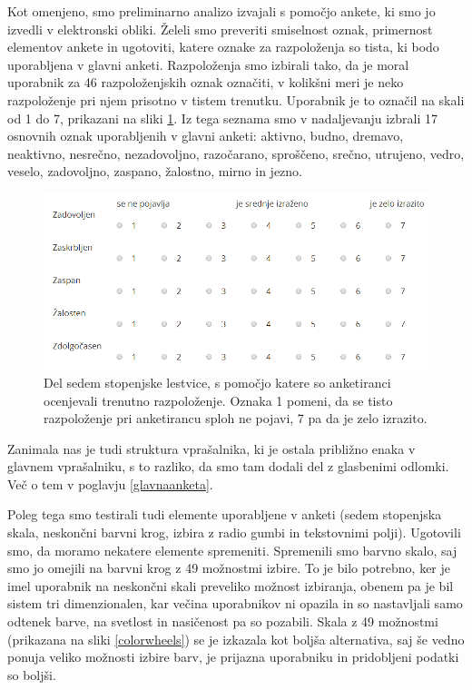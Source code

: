 \documentclass[a4paper, 12pt]{book}
\begin{document}
{Kot omenjeno, smo preliminarno analizo izvajali s pomočjo ankete, ki smo jo izvedli v elektronski obliki. Želeli smo preveriti smiselnost oznak, primernost elementov ankete in ugotoviti, katere oznake za razpoloženja so tista, ki bodo uporabljena v glavni anketi. Razpoloženja smo izbirali tako, da je moral uporabnik za 46 razpoloženjskih oznak označiti, v kolikšni meri je neko razpoloženje pri njem prisotno v tistem trenutku. Uporabnik je to označil na skali od 1 do 7, prikazani na sliki \ref{skala}. Iz tega seznama smo v nadaljevanju izbrali 17 osnovnih oznak uporabljenih v glavni anketi: aktivno, budno, dremavo, neaktivno, nesrečno, nezadovoljno, razočarano, sproščeno, srečno, utrujeno, vedro, veselo, zadovoljno, zaspano, žalostno, mirno in jezno.

\begin{figure}[ht]
\centering
\includegraphics[width=13cm]{images/likart.png}

\caption{Del sedem stopenjske lestvice, s pomočjo katere so anketiranci ocenjevali trenutno razpoloženje. Oznaka 1 pomeni, da se tisto razpoloženje pri anketirancu sploh ne pojavi, 7 pa da je zelo izrazito. }
\label{skala}
\end{figure}

Zanimala nas je tudi struktura vprašalnika, ki je ostala približno enaka v glavnem vprašalniku, s to razliko, da smo tam dodali del z glasbenimi odlomki. Več o tem v poglavju \ref{glavnaanketa}.

Poleg tega smo testirali tudi elemente uporabljene v anketi (sedem stopenjska skala, neskončni barvni krog, izbira z radio gumbi in tekstovnimi polji). Ugotovili smo, da moramo nekatere elemente spremeniti. Spremenili smo barvno skalo, saj smo jo omejili na barvni krog z 49 možnostmi izbire. To je bilo potrebno, ker je imel uporabnik na neskončni skali preveliko možnost izbiranja, obenem pa je bil sistem tri dimenzionalen, kar večina uporabnikov ni opazila in so nastavljali samo odtenek barve, na svetlost in nasičenost pa so pozabili. Skala z 49 možnostmi (prikazana na sliki \ref{colorwheels}) se je izkazala kot boljša alternativa, saj še vedno ponuja veliko možnosti izbire barv, je prijazna uporabniku in pridobljeni podatki so boljši.

}
\end{document}
